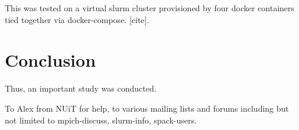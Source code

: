 \documentclass[sigconf,authordraft]{acmart}
\begin{document}
This was tested on a virtual slurm cluster provisioned by four docker containers tied together via docker-compose. [cite].


\section{Conclusion}
Thus, an important study was conducted.

\begin{acks}
To Alex from NUiT for help, to various mailing lists and forums including but not limited to mpich-discuss, slurm-info, spack-users.
\end{acks}




\end{document}
